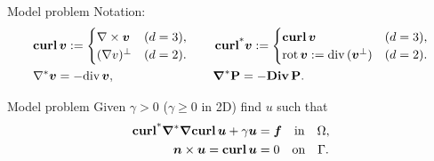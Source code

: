 \documentclass[10pt]{beamer}
\begin{document}
\begin{frame}{Model problem}
Notation:
        \begin{align*}
       &{\bf curl\,}\boldsymbol{v}:= \begin{cases} \nabla\times\boldsymbol{v} & (d=3),\\ (\nabla v)^\perp & (d=2).\end{cases} \quad
       &&\operatorname{\mathbf{curl^*\!}}\boldsymbol{v} := \begin{cases} {\bf curl\,}\boldsymbol{v} & (d=3),\\ {\rm rot\,}\boldsymbol{v}:={\rm div\,}(\boldsymbol{v}^\perp) & (d=2).\end{cases} \\
       &\nabla^{*} \boldsymbol{v} = -{\rm div\,} \boldsymbol{v}, \quad &&\boldsymbol{\nabla}^{*} \mathbf{P} = -{\rm\bf Div\,} \mathbf{P}. 
       \end{align*}
    
    \begin{block}{Model problem} Given $\gamma>0$ ($\gamma \geq 0$ in 2D) find $u$ such that
    \begin{align*} 
        \operatorname{\mathbf{curl^*\!}}\boldsymbol{\nabla}^{*} \boldsymbol{\nabla} {\bf curl\,} \boldsymbol{u} +\gamma \boldsymbol{u} &= \boldsymbol{f}  \quad \text{in} \quad \Omega, \\
        \boldsymbol{n} \times \boldsymbol{u} = {\bf curl\,} \boldsymbol{u}  &= 0 \quad \text{on} \quad \Gamma. \\
    \end{align*}
    \end{block}  
\end{frame}
\end{document}
